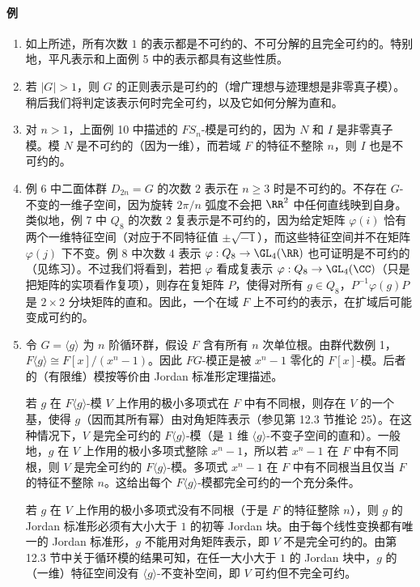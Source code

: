 \paragraph{例}
\begin{enumerate}[label=(\arabic*)]
  \item 如上所述，所有次数 $1$ 的表示都是不可约的、不可分解的且完全可约的。特别地，平凡表示和上面例 5 中的表示都具有这些性质。
  \item 若 $|G|>1$，则 $G$ 的正则表示是可约的（增广理想与迹理想是非零真子模）。稍后我们将判定该表示何时完全可约，以及它如何分解为直和。
  \item 对 $n>1$，上面例 10 中描述的 $FS_n$-模是可约的，因为 $N$ 和 $I$ 是非零真子模。模 $N$ 是不可约的（因为一维），而若域 $F$ 的特征不整除 $n$，则 $I$ 也是不可约的。
  \item 例 6 中二面体群 $D_{2n}=G$ 的次数 $2$ 表示在 $n\geq3$ 时是不可约的。不存在 $G$-不变的一维子空间，因为旋转 $2\pi/n$ 弧度不会把 $\RR^2$ 中任何直线映到自身。类似地，例 7 中 $Q_8$ 的次数 $2$ 复表示是不可约的，因为给定矩阵 $\varphi(i)$ 恰有两个一维特征空间（对应于不同特征值 $\pm\sqrt{-1}$），而这些特征空间并不在矩阵 $\varphi(j)$ 下不变。例 8 中次数 $4$ 表示 $\varphi:Q_8\to\GL_4(\RR)$ 也可证明是不可约的（见练习）。不过我们将看到，若把 $\varphi$ 看成复表示 $\varphi:Q_8\to\GL_4(\CC)$（只是把矩阵的实项看作复项），则存在复矩阵 $P$，使得对所有 $g\in Q_8$，$P^{-1}\varphi(g)P$ 是 $2\times2$ 分块矩阵的直和。因此，一个在域 $F$ 上不可约的表示，在扩域后可能变成可约的。
  \item 令 $G=\langle g\rangle$ 为 $n$ 阶循环群，假设 $F$ 含有所有 $n$ 次单位根。由群代数例 1，$F\langle g\rangle\cong F[x]/(x^n-1)$。因此 $FG$-模正是被 $x^n-1$ 零化的 $F[x]$-模。后者的（有限维）模按等价由 Jordan 标准形定理描述。

  若 $g$ 在 $F\langle g\rangle$-模 $V$ 上作用的极小多项式在 $F$ 中有不同根，则存在 $V$ 的一个基，使得 $g$（因而其所有幂）由对角矩阵表示（参见第 12.3 节推论 25）。在这种情况下，$V$ 是完全可约的 $F\langle g\rangle$-模（是 $1$ 维 $\langle g\rangle$-不变子空间的直和）。一般地，$g$ 在 $V$ 上作用的极小多项式整除 $x^n-1$，所以若 $x^n-1$ 在 $F$ 中有不同根，则 $V$ 是完全可约的 $F\langle g\rangle$-模。多项式 $x^n-1$ 在 $F$ 中有不同根当且仅当 $F$ 的特征不整除 $n$。这给出每个 $F\langle g\rangle$-模都完全可约的一个充分条件。

  若 $g$ 在 $V$ 上作用的极小多项式没有不同根（于是 $F$ 的特征整除 $n$），则 $g$ 的 Jordan 标准形必须有大小大于 $1$ 的初等 Jordan 块。由于每个线性变换都有唯一的 Jordan 标准形，$g$ 不能用对角矩阵表示，即 $V$ 不是完全可约的。由第 12.3 节中关于循环模的结果可知，在任一大小大于 $1$ 的 Jordan 块中，$g$ 的（一维）特征空间没有 $\langle g\rangle$-不变补空间，即 $V$ 可约但不完全可约。


\end{enumerate}
